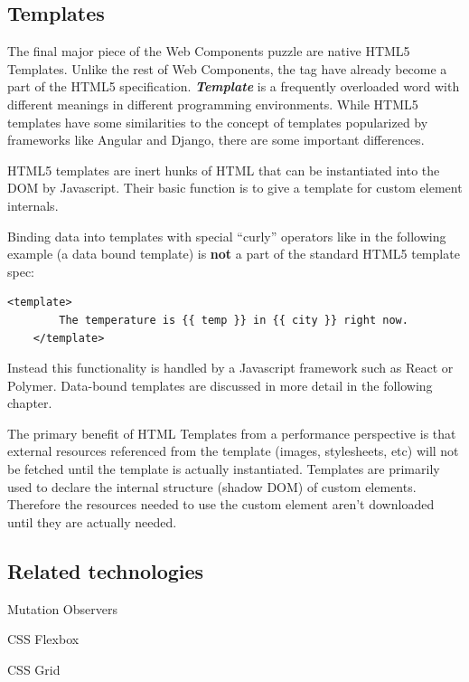 \subsection{Templates}
The final major piece of the Web Components puzzle are native HTML5 Templates. 
Unlike the rest of Web Components, the  tag have already become a part of the HTML5 specification.
\textit{\textbf{Template}} is a frequently overloaded word with different meanings in different programming environments.
While HTML5 templates have some similarities to the concept of templates popularized by frameworks like Angular and Django, there are some important differences.

HTML5 templates are inert hunks of HTML that can be instantiated into the DOM by Javascript.
Their basic function is to give a template for custom element internals.

Binding data into templates with special ``curly'' operators like in the following example (a data bound template) is \textbf{not} a part of the standard HTML5 template spec:

\begin{lstlisting}[language=HTML5]
	<template> 
		The temperature is {{ temp }} in {{ city }} right now.
	</template>
\end{lstlisting}

Instead this functionality is handled by a Javascript framework such as React or Polymer.
Data-bound templates are discussed in more detail in the following chapter.

The primary benefit of HTML Templates from a performance perspective is that external resources referenced from the template (images, stylesheets, etc) will not be fetched until the template is actually instantiated.
Templates are primarily used to declare the internal structure (shadow DOM) of custom elements. 
Therefore the resources needed to use the custom element aren't downloaded until they are actually needed.



\subsection{Related technologies}

Mutation Observers

CSS Flexbox

CSS Grid



